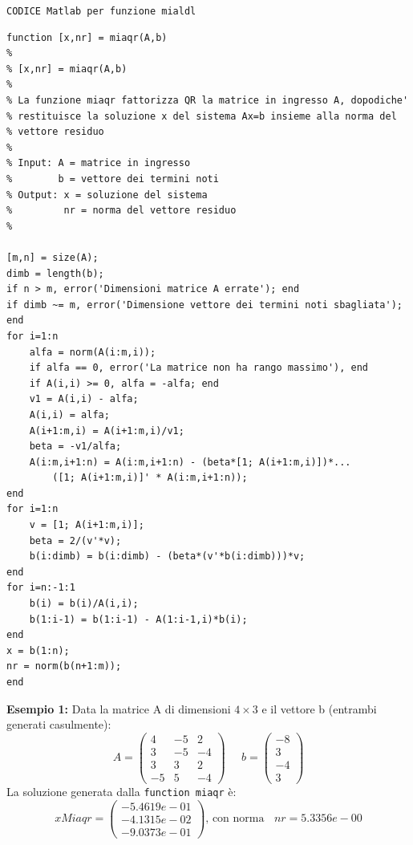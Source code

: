 \documentclass[12pt]{article}
\begin{document}
\texttt{CODICE Matlab per funzione mialdl}
\begin{lstlisting}[frame=single]
function [x,nr] = miaqr(A,b)
%
% [x,nr] = miaqr(A,b)
%
% La funzione miaqr fattorizza QR la matrice in ingresso A, dopodiche'  
% restituisce la soluzione x del sistema Ax=b insieme alla norma del
% vettore residuo
% 
% Input: A = matrice in ingresso
%        b = vettore dei termini noti
% Output: x = soluzione del sistema
%         nr = norma del vettore residuo
%

[m,n] = size(A);
dimb = length(b);
if n > m, error('Dimensioni matrice A errate'); end
if dimb ~= m, error('Dimensione vettore dei termini noti sbagliata'); end
for i=1:n
    alfa = norm(A(i:m,i));
    if alfa == 0, error('La matrice non ha rango massimo'), end
    if A(i,i) >= 0, alfa = -alfa; end
    v1 = A(i,i) - alfa;
    A(i,i) = alfa;
    A(i+1:m,i) = A(i+1:m,i)/v1;
    beta = -v1/alfa;
    A(i:m,i+1:n) = A(i:m,i+1:n) - (beta*[1; A(i+1:m,i)])*...
        ([1; A(i+1:m,i)]' * A(i:m,i+1:n));
end
for i=1:n
    v = [1; A(i+1:m,i)];
    beta = 2/(v'*v);
    b(i:dimb) = b(i:dimb) - (beta*(v'*b(i:dimb)))*v;
end
for i=n:-1:1
    b(i) = b(i)/A(i,i);
    b(1:i-1) = b(1:i-1) - A(1:i-1,i)*b(i);
end
x = b(1:n);
nr = norm(b(n+1:m));
end
\end{lstlisting}
\textbf{Esempio 1:}
Data la matrice A di dimensioni \(4 \times 3\) e il vettore b (entrambi generati casulmente):
\begin{equation}A=
    \begin{pmatrix}
        4 &	-5 & 2 \\
        3 & -5 & -4 \\
        3 & 3 & 2 \\
        -5 & 5 &-4
    \end{pmatrix}\;\;\;\;\;
    b=
    \begin{pmatrix}
        -8\\
        3\\
        -4\\
        3 
    \end{pmatrix}
\end{equation}
La soluzione generata dalla \texttt{function miaqr} è:
\begin{equation*}xMiaqr=
    \begin{pmatrix}
        -5.4619e-01\\
        -4.1315e-02\\
        -9.0373e-01
    \end{pmatrix}\text{, con norma }\;\; nr = 5.3356e-00
\end{equation*}
\end{document}
